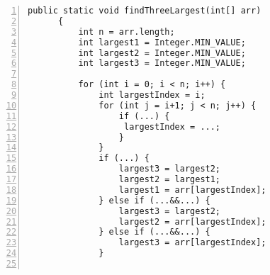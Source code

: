 \documentclass{article}
\begin{document}
\begin{enumerate}
\begin{enumerate}
\begin{lstlisting}[numbers=left,frame=single,numbersep= -8pt]
      public static void findThreeLargest(int[] arr)
      {
          int n = arr.length;
          int largest1 = Integer.MIN_VALUE;
          int largest2 = Integer.MIN_VALUE;
          int largest3 = Integer.MIN_VALUE;
  
          for (int i = 0; i < n; i++) {
              int largestIndex = i;
              for (int j = i+1; j < n; j++) {
                  if (...) {
                   largestIndex = ...;
                  }
              }
              if (...) {
                  largest3 = largest2;
                  largest2 = largest1;
                  largest1 = arr[largestIndex];
              } else if (...&&...) {
                  largest3 = largest2;
                  largest2 = arr[largestIndex];
              } else if (...&&...) {
                  largest3 = arr[largestIndex];
              }
  

\end{lstlisting}
\end{enumerate}
\end{enumerate}
\end{document}
